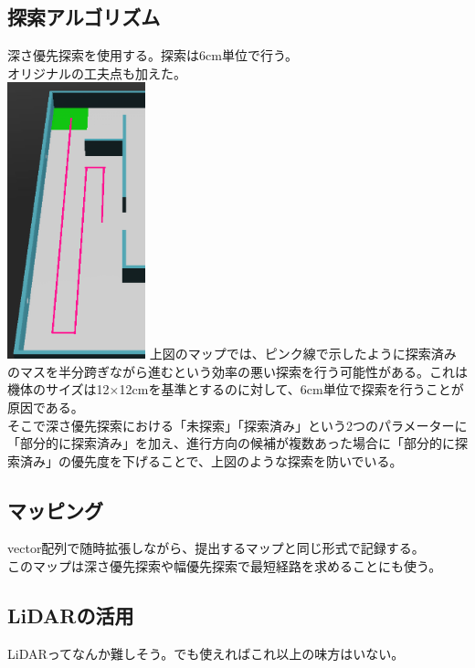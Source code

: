 \documentclass[dvipdfmx,a4paper]{jsarticle}
\begin{document}
    \subsection{探索アルゴリズム}
    深さ優先探索を使用する。探索は6cm単位で行う。\\
    オリジナルの工夫点も加えた。\\
    \includegraphics[width=40mm]{Photo/feagure1.png}
    \noindent
    上図のマップでは、ピンク線で示したように探索済みのマスを半分跨ぎながら進むという効率の悪い探索を行う可能性がある。これは機体のサイズは12$\times$12cmを基準とするのに対して、6cm単位で探索を行うことが原因である。\\
    そこで深さ優先探索における「未探索」「探索済み」という2つのパラメーターに「部分的に探索済み」を加え、進行方向の候補が複数あった場合に「部分的に探索済み」の優先度を下げることで、上図のような探索を防いでいる。\\

    \subsection{マッピング}
    \noindent
    vector配列で随時拡張しながら、提出するマップと同じ形式で記録する。\\
    このマップは深さ優先探索や幅優先探索で最短経路を求めることにも使う。

    \subsection{LiDARの活用}
    LiDARってなんか難しそう。でも使えればこれ以上の味方はいない。
\end{document}
